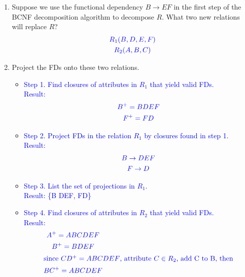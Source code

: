 \documentclass{article}
\begin{document}
\begin{enumerate}
\begin{enumerate}
        \item Suppose we use the functional dependency $B \rightarrow EF$ in the first step of the BCNF decomposition algorithm to decompose $R$. What two new relations will replace $R$?
        \\
        \begin{gather*}
            \textcolor{blue}{R_1(B, D, E, F)}\\
            \textcolor{blue}{R_2(A, B, C)}
        \end{gather*}
        \item Project the FDs onto these two relations.
        \\
        \begin{itemize}[label=\textcolor{blue}{\textbullet}]
            \item \textcolor{blue}{Step 1. } \textcolor{blue}{Find closures of attributes in $R_1$ that yield valid FDs.}\\
            \textcolor{blue}{Result: }
            \begin{gather*}
                \textcolor{blue}{B^+ = BDEF}\\
                \textcolor{blue}{F^+ = FD}
            \end{gather*}
            
            \item \textcolor{blue}{Step 2. } \textcolor{blue}{Project FDs in the relation $R_1$ by closures found in step 1.}\\
            \textcolor{blue}{Result: }
            \begin{gather*}
                \textcolor{blue}{B \rightarrow DEF}\\
                \textcolor{blue}{F \rightarrow D}
            \end{gather*}
            
            \item \textcolor{blue}{Step 3. } \textcolor{blue}{List the set of projections in $R_1$.}
            \\
            \textcolor{blue}{Result: }
            \textcolor{blue}{\{B \rightarrow DEF, F\rightarrow D\}}\\
            
            \item \textcolor{blue}{Step 4. } \textcolor{blue}{Find closures of attributes in $R_2$ that yield valid FDs.}\\
            \textcolor{blue}{Result: }
            \begin{gather*}
                \textcolor{blue}{A^+ = ABCDEF}\\
                \textcolor{blue}{B^+ = BDEF}\\
                \shortintertext{\textcolor{blue}{since $CD^+ = ABCDEF$, attribute $C \in R_2$, add C to B, then}}
                \textcolor{blue}{BC^+ = ABCDEF}
            \end{gather*}
            

\end{itemize}
\end{enumerate}
\end{enumerate}
\end{document}
